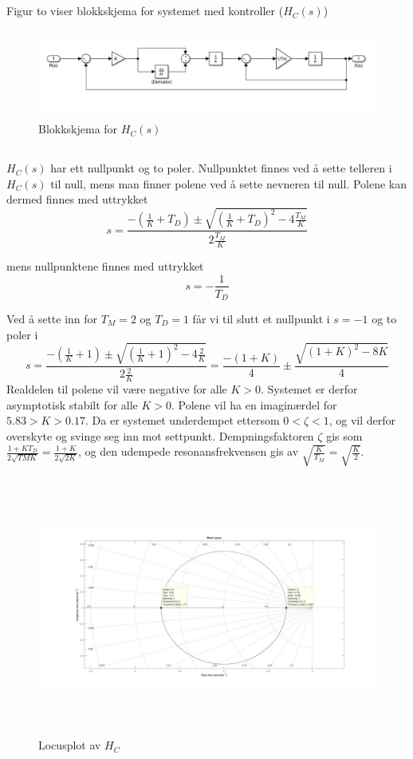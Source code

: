 \documentclass[norsk]{article}
\begin{document}
\subsection{ }
Figur to viser blokkskjema for systemet med kontroller (\(H_C(s)\))
\begin{figure}[!htb]
\includegraphics[height=2.9cm]{illustrations/oppg1d_illu}
\caption{Blokkskjema for \(H_C(s)\)}
\end{figure}

\subsection{ }
\(H_C(s)\) har ett nullpunkt og to poler. Nullpunktet finnes ved å sette telleren i \(H_C(s)\) til null, mens man finner polene ved å sette nevneren til null. Polene kan dermed finnes med uttrykket
\[s = \frac{-(\frac{1}{K} + T_D) \pm \sqrt{(\frac{1}{K} + T_D)^2 - 4\frac{T_M}{K}}}{2\frac{T_M}{K}}\]

mens nullpunktene finnes med uttrykket
\[s = -\frac{1}{T_D}\]

Ved å sette inn for \(T_M = 2\) og \(T_D = 1\) får vi til slutt et nullpunkt i \(s = -1\) og to poler i
\[s = \frac{-(\frac{1}{K} + 1) \pm \sqrt{(\frac{1}{K} + 1)^2 - 4\frac{2}{K}}}{2\frac{2}{K}} = \frac{-(1+K)}{4}\pm\frac{\sqrt{(1+K)^2-8K}}{4}\]
Realdelen til polene vil være negative for alle \(K > 0\). Systemet er derfor asymptotisk stabilt for alle \(K>0\). Polene vil ha en imaginærdel for \(5.83 > K > 0.17\). Da er systemet underdempet ettersom \(0 < \zeta < 1\), og vil derfor overskyte og svinge seg inn mot settpunkt. Dempningsfaktoren \(\zeta\) gis som \(\frac{1+KT_D}{2\sqrt{TMK}} = \frac{1+K}{2\sqrt{2K}}\), og den udempede resonansfrekvensen gis av \(\sqrt{\frac{K}{T_M}} = \sqrt{\frac{K}{2}}\).

\begin{figure}[H]
\hspace{-2cm}
\includegraphics[height=8.5cm]{illustrations/oppg1e_illu}
\caption{Locusplot av \(H_C\)}
\end{figure}
\end{document}
